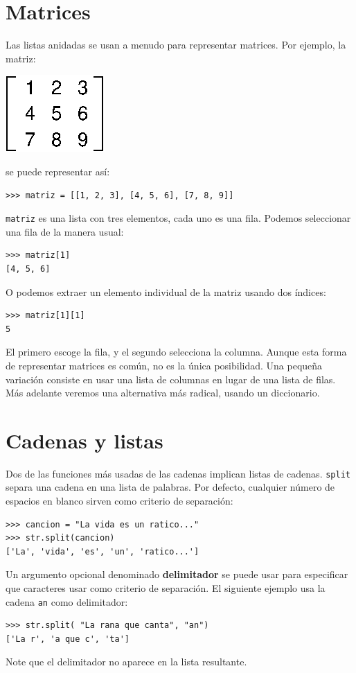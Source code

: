 \section{Matrices}

 

Las listas anidadas se usan a menudo para representar matrices. Por
ejemplo, la matriz:

\beforefig \centerline{\includegraphics{illustrations/matrix}}
\afterfig

se puede representar así:
\begin{lstlisting}
>>> matriz = [[1, 2, 3], [4, 5, 6], [7, 8, 9]]
\end{lstlisting}
\texttt{matriz} es una lista con tres elementos, cada uno es una fila.
Podemos seleccionar una fila de la manera usual:
\begin{lstlisting}
>>> matriz[1]
[4, 5, 6]
\end{lstlisting}
O podemos extraer un elemento individual de la matriz usando dos índices:
\begin{lstlisting}
>>> matriz[1][1]
5
\end{lstlisting}
El primero escoge la fila, y el segundo selecciona la columna. Aunque
esta forma de representar matrices es común, no es la única posibilidad.
Una pequeña variación consiste en usar una lista de columnas en lugar
de una lista de filas. Más adelante veremos una alternativa más radical,
usando un diccionario.

  

\section{Cadenas y listas}

 

Dos de las funciones más usadas de las cadenas implican listas de
cadenas. \texttt{split} separa una cadena en una lista de palabras.
Por defecto, cualquier número de espacios en blanco sirven como criterio
de separación:
\begin{verbatim}
>>> cancion = "La vida es un ratico..."
>>> str.split(cancion)
['La', 'vida', 'es', 'un', 'ratico...']
\end{verbatim}
Un argumento opcional denominado \textbf{delimitador} se puede usar
para especificar que caracteres usar como criterio de separación.
El siguiente ejemplo usa la cadena \texttt{an} como delimitador:
\begin{lstlisting}
>>> str.split( "La rana que canta", "an")
['La r', 'a que c', 'ta']
\end{lstlisting}
Note que el delimitador no aparece en la lista resultante.

